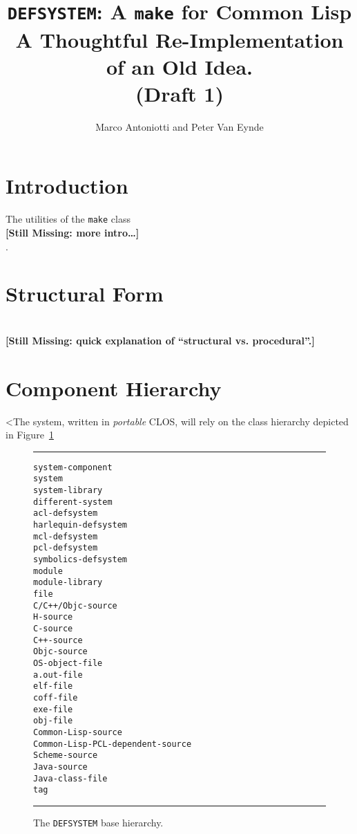 \documentclass[a4paper]{article}
\title{
\texttt{DEFSYSTEM}: A \texttt{make} for Common Lisp\\
{\normalsize A Thoughtful Re-Implementation of an Old Idea.}\\
(Draft 1)
}
\author{Marco Antoniotti and Peter Van Eynde}
\newcommand{\CLOS}{\textsc{CLOS}}
\newcommand{\missingpart}[1]{{\ }\vspace{2mm}\\
{\textbf{[Still Missing: #1]}}\\
\vspace{2mm}}
\begin{document}
\maketitle

\section{Introduction}

The utilities of the \texttt{make} class \missingpart{more
intro\ldots}.


\section{Structural Form}

\missingpart{quick explanation of ``structural vs. procedural''.}

\section{Component Hierarchy}

<The system, written in \emph{portable} \CLOS{}, will rely on the
class hierarchy depicted in Figure~\ref{fig:class-hier}

\begin{figure}
\rule{\textwidth}{2pt}
\begin{alltt}
system-component
        system
                system-library
                different-system
                        acl-defsystem
                        harlequin-defsystem
                        mcl-defsystem
                        pcl-defsystem
                        symbolics-defsystem
        module
                module-library
        file
                C/C++/Objc-source
                        H-source
                        C-source
                        C++-source
                        Objc-source
                OS-object-file
                        a.out-file
                        elf-file
                        coff-file
                        exe-file
                        obj-file
                Common-Lisp-source
                        Common-Lisp-PCL-dependent-source
                Scheme-source
                Java-source
                Java-class-file
         tag
\end{alltt}
\rule{\textwidth}{2pt}
\caption{The \texttt{DEFSYSTEM} base hierarchy.}
\label{fig:class-hier}
\end{figure}
\end{document}
